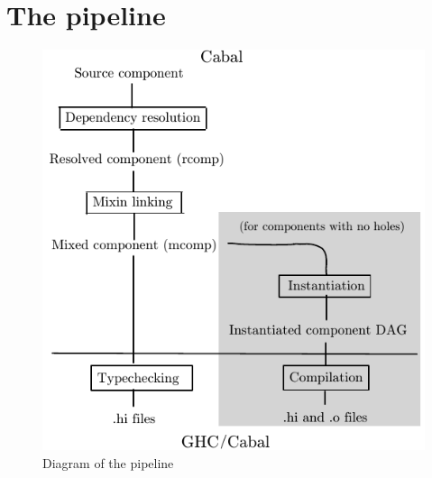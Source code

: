 \chapter{The pipeline}
\label{sec:overview}

\begin{figure}
\includegraphics{diagrams/pipeline.pdf}
\caption{Diagram of the pipeline}\label{fig:pipeline}
\end{figure}

